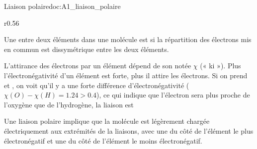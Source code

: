 \begin{doc}{Liaison polaire}{doc:A1_liaison_polaire}
  \begin{wrapfigure}[6]{r}{0.56\linewidth}
    \centering
    \vspace*{-20pt}

    \vspace*{-8pt}
  \end{wrapfigure}
  \phantom{b}\vspace*{-20pt}
    
  \begin{importants}
    Une  entre deux éléments dans une molécule est  si la répartition des électrons mis en commun est dissymétrique entre les deux éléments.
  \end{importants}
  L'attirance des électrons par un élément dépend de son  notée $\chi$ (« ki »).
  Plus l'électronégativité d'un élément est forte, plus il attire les électrons.
  Si on prend  et , on voit qu'il y a une forte différence d'électronégativité ($\chi(O) - \chi(H) = \num{1.24} > \num{0,4}$), ce qui indique que l'électron sera plus proche de l'oxygène que de l'hydrogène, la liaison  est 

  \begin{importants}  
    Une liaison polaire implique que la molécule est légèrement chargée électriquement aux extrémités de la liaisons, avec une  du côté de l'élément le plus électronégatif et une  du côté de l'élément le moins électronégatif.
  \end{importants}
\end{doc}


